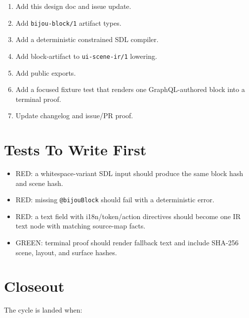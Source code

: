 \begin{enumerate}
\def\labelenumi{\arabic{enumi}.}
\tightlist
\item
  Add this design doc and issue update.
\item
  Add \texttt{b\allowbreak{}i\allowbreak{}j\allowbreak{}o\allowbreak{}u\allowbreak{}-\allowbreak{}b\allowbreak{}l\allowbreak{}o\allowbreak{}c\allowbreak{}k\allowbreak{}/\allowbreak{}1} artifact types.
\item
  Add a deterministic constrained SDL compiler.
\item
  Add block-artifact to \texttt{u\allowbreak{}i\allowbreak{}-\allowbreak{}s\allowbreak{}c\allowbreak{}e\allowbreak{}n\allowbreak{}e\allowbreak{}-\allowbreak{}i\allowbreak{}r\allowbreak{}/\allowbreak{}1} lowering.
\item
  Add public exports.
\item
  Add a focused fixture test that renders one GraphQL-authored block into a terminal proof.
\item
  Update changelog and issue/PR proof.
\end{enumerate}

\section{Tests To Write First}\label{record-140-tests-to-write-first}

\begin{itemize}
\tightlist
\item
  RED: a whitespace-variant SDL input should produce the same block hash and scene hash.
\item
  RED: missing \texttt{@\allowbreak{}b\allowbreak{}i\allowbreak{}j\allowbreak{}o\allowbreak{}u\allowbreak{}B\allowbreak{}l\allowbreak{}o\allowbreak{}c\allowbreak{}k} should fail with a deterministic error.
\item
  RED: a text field with i18n/token/action directives should become one IR text node with matching source-map facts.
\item
  GREEN: terminal proof should render fallback text and include SHA-256 scene, layout, and surface hashes.
\end{itemize}

\section{Closeout}\label{record-140-closeout}

The cycle is landed when:

